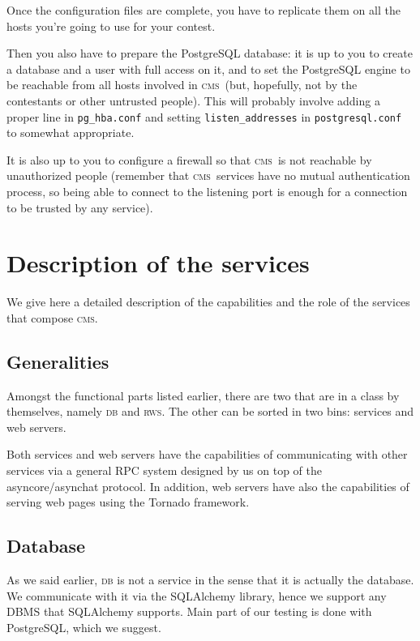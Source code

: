 \documentclass[a4paper,8pt]{amsart}
\newcommand{\CMS}{\textsc{cms}}
\newcommand{\DB}{\textsc{db}}
\newcommand{\RWS}{\textsc{rws}}
\newcommand{\id}[1]{\texttt{#1}}
\newcommand{\file}[1]{\texttt{#1}}
\begin{document}
\begin{multicols}{2}
  Once the configuration files are complete, you have to replicate
  them on all the hosts you're going to use for your contest.

  Then you also have to prepare the PostgreSQL database\todo{Merge
    \file{postgresql\_howto.txt} here}: it is up to you to create a
  database and a user with full access on it, and to set the
  PostgreSQL engine to be reachable from all hosts involved in
  \CMS\ (but, hopefully, not by the contestants or other untrusted
  people). This will probably involve adding a proper line in
  \file{pg\_hba.conf} and setting \id{listen\_addresses} in
  \file{postgresql.conf} to somewhat appropriate.

  It is also up to you to configure a firewall so that \CMS\ is not
  reachable by unauthorized people (remember that \CMS\ services have
  no mutual authentication process, so being able to connect to the
  listening port is enough for a connection to be trusted by any
  service).

  \section{Description of the services}

  We give here a detailed description of the capabilities and the role
  of the services that compose \CMS{}.

  \subsection{Generalities}

  Amongst the functional parts listed earlier, there are two that are
  in a class by themselves, namely \DB{} and \RWS{}. The other can be
  sorted in two bins: services and web servers.

  Both services and web servers have the capabilities of communicating
  with other services via a general RPC system designed by us on top
  of the asyncore/asynchat protocol. In addition, web servers have
  also the capabilities of serving web pages using the Tornado
  framework.

  \subsection{Database}

  As we said earlier, \DB{} is not a service in the sense that it is
  actually the database. We communicate with it via the SQLAlchemy
  library, hence we support any DBMS that SQLAlchemy supports. Main
  part of our testing is done with PostgreSQL, which we suggest.


\end{multicols}
\end{document}
